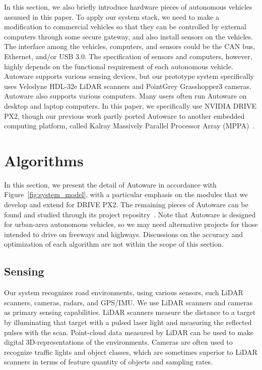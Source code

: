 In this section, we also briefly introduce hardware pieces of autonomous
vehicles assumed in this paper.
To apply our system stack, we need to make a modification to commercial
vehicles so that they can be controlled by external computers through
some secure gateway, and also install sensors on the vehicles.
The interface among the vehicles, computers, and sensors could be the
CAN bus, Ethernet, and/or USB 3.0.
The specification of sensors and computers, however, highly depends on
the functional requirement of each autonomous vehicle.
Autoware supports various sensing devices, but our prototype system
specifically uses Velodyne HDL-32e LiDAR scanners and PointGrey
Grasshopper3 cameras.
Autoware also supports various computers.
Many users often run Autoware on desktop and laptop computers.
In this paper, we specifically use NVIDIA DRIVE PX2, though our previous
work partly ported Autoware to another embedded computing platform,
called Kalray Massively Parallel Processor Array
(MPPA)~\cite{yuya2017exploring}. 

\section{Algorithms}
\label{sec:system_model}

In this section, we present the detail of Autoware in accordance with
Figure~\ref{fig:system_model}, with a particular emphasis on the modules
that we develop and extend for DRIVE PX2.
The remaining pieces of Autoware can be found and studied through its
project repositry~\cite{autoware}.
Note that Autoware is designed for urban-area autonomous vehicles, so we
may need alternative projects for those intended to drive on freeways
and highways.
Discussions on the accuracy and optimization of each algorithm are not
within the scope of this section.

\subsection{Sensing}
\label{sec:sensing}
Our system recognizes road environments, using various sensors, such
LiDAR scanners, cameras, radars, and GPS/IMU.
We use LiDAR scanners and cameras as primary sensing capabilities.
LiDAR scanners measure the distance to a target by illuminating that
target with a pulsed laser light and measuring the reflected pulses with
the scan.
Point-cloud data measured by LiDAR can be used to make digital
3D-representations of the environments.
Cameras are often used to recognize traffic lights and object classes,
which are sometimes superior to LiDAR scanners in terms of feature
quantity of objects and sampling rates.

